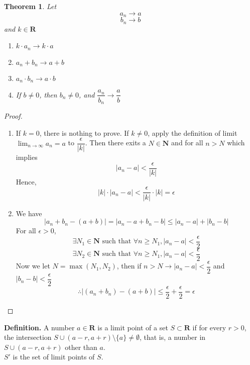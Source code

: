 \documentclass[10pt,letterpaper]{article}
\newtheorem{thm}{Theorem}
\begin{document}
	\begin{thm}
		Let 
			$$a_n \rightarrow a$$
			$$b_n \rightarrow b$$
		and $k \in \mathbf{R}$
		\begin{enumerate}
		\item $k \cdot a_n \rightarrow k \cdot a$
		\item $a_n + b_n \rightarrow a + b$ 
		\item $a_n \cdot b_n \rightarrow a \cdot b$ 
		\item If $b \neq 0$, then $b_n \neq 0$, and $\dfrac{a_n}{b_n} \rightarrow \dfrac{a}{b}$
		\end{enumerate}
	\end{thm}
	\begin{proof}
		\begin{enumerate}
			\item If $k = 0$, there is nothing to prove. If $k \neq 0$, apply the definition of limit
			$\displaystyle\lim_{n\to\infty}a_n = a$ to $\dfrac{\epsilon}{|k|}$. Then there exits
			a $N \in \mathbf{N}$ and for all $n > N$ which implies
			$$|a_n - a| < \dfrac{\epsilon}{|k|}$$
			Hence,
			$$|k| \cdot |a_n - a| < \dfrac{\epsilon}{|k|} \cdot |k| = \epsilon$$
			
			\item We have
			$$|a_n + b_n - (a + b)| = |a_n - a + b_n - b| \leq |a_n - a| + |b_n - b|$$
			For all $\epsilon > 0$,
			$$\exists N_1 \in \mathbf{N} \text{ such that } \forall n \geq N_1,  |a_n - a| < \dfrac{\epsilon}{2}$$
			$$\exists N_2 \in \mathbf{N} \text{ such that } \forall n \geq N_1,  |a_n - a| < \dfrac{\epsilon}{2}$$  
			Now we let $N = \max(N_1, N_2)$, then if $n > N \rightarrow |a_n - a| < \dfrac{\epsilon}{2}$ and 
			$|b_n - b| < \dfrac{\epsilon}{2}$
			$$\therefore |(a_n + b_n) - (a + b)| \leq \dfrac{\epsilon}{2} + \dfrac{\epsilon}{2} = \epsilon$$  		
		\end{enumerate}
	\end{proof}

	\newpage
	\textbf{Definition. } A number $a \in \mathbf{R}$ is a limit point of a set $S \subset \mathbf{R}$ if
	for every $r > 0$, the intersection $S \cup (a - r, a + r) \setminus \{a\} \neq \emptyset$, that
	is, a number in $S \cup (a - r, a + r)$ other than $a$. \\
	$S'$ is the set of limit points of $S$. \\
	
\end{document}
